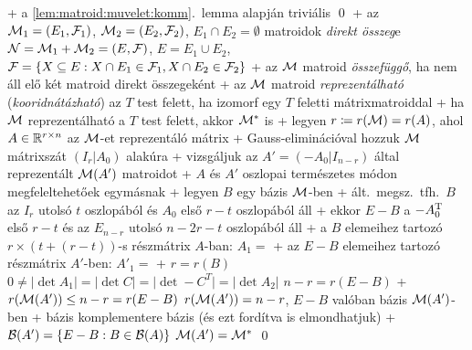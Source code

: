   + \proof a \ref{lem:matroid:muvelet:komm}.~lemma alapján triviális
    \qed
+ \dfn az $\mathcal{M}_1 = (E_1, \mathcal{F}_1)$, $\mathcal{M}_2 = (E_2, \mathcal{F}_2)$, $E_1 \cap
  E_2 = \emptyset$ matroidok \emph{direkt összeg}e $\mathcal{N} = \mathcal{M}_1 +
  \mathcal{M}_2 = (E, \mathcal{F})$, $E = E_1 \cup E_2$, $\mathcal{F} = \{ X \subseteq E : X
  \cap E_1 \in \mathcal{F}_1, X \cap E_2 \in \mathcal{F}_2 \}$
+ \dfn az $\mathcal{M}$ matroid \emph{összefüggő}, ha nem áll elő két matroid
  direkt összegeként
+ \dfn az $\mathcal{M}$ matroid \emph{reprezentálható}
  (\emph{kooridnátázható}) az $T$ test felett, ha izomorf egy $T$
  feletti mátrixmatroiddal
+ \thm ha $\mathcal{M}$ reprezentálható a $T$ test felett, akkor $\mathcal{M}^*$ is
  + \proof legyen $r \coloneqq r(\mathcal{M}) = r(A)$, ahol $A \in \mathbb{R}^{r
    \times n}$ az $\mathcal{M}$-et reprezentáló mátrix
    + Gauss-eliminációval hozzuk $\mathcal{M}$ mátrixszát $(I_r | A_0)$
      alakúra
  + vizsgáljuk az $A' = (-A_0 | I_{n - r})$ által reprezentált
    $\mathcal{M}(A')$ matroidot
    + $A$ és $A'$ oszlopai természetes módon megfeleltehetőek egymásnak
    + legyen $B$ egy bázis $\mathcal{M}$-ben
      + ált.~megsz.~tfh.~$B$ az $I_r$ utolsó $t$ oszlopából és $A_0$
        első $r - t$ oszlopából áll
      + ekkor $E - B$ a $-A_0^{\mathrm{T}}$ első $r - t$ és az $E_{n - r}$
        utolsó $n - 2r - t$ oszlopából áll
      + a $B$ elemeihez tartozó $r \times (t + (r - t))$-s részmátrix $A$-ban: $A_1 =$
      + az $E - B$ elemeihez tartozó részmátrix $A'$-ben: $A'_1 =$
    + $r = r(B)$ \LRA $0 \ne \rvert \det A_1 \lvert = \rvert \det C \lvert = \rvert
      \det -C^T \lvert = \rvert \det A_2 \lvert$ \LRA $n - r = r(E -
      B)$
  + $r(\mathcal{M}(A')) \le n - r = r(E - B)$ \RA $r(\mathcal{M}(A')) = n - r$, $E -
    B$ valóban bázis $\mathcal{M}(A')$-ben
    + bázis komplementere bázis (és ezt fordítva is elmondhatjuk)
    + $\mathcal{B}(A') = \{ E - B : B \in \mathcal{B}(A) \}$ \RA $\mathcal{M}(A') = \mathcal{M}^*$ \qed

